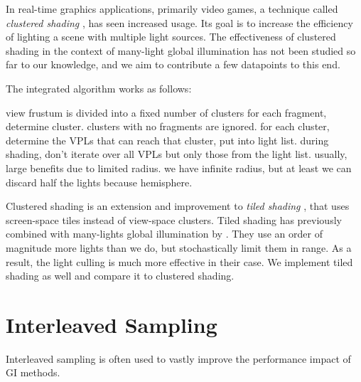 In real-time graphics applications, primarily video games, a technique called \textit{clustered shading} \citep{olsson2012clustered}, has seen increased usage. Its goal is to increase the efficiency of lighting a scene with multiple light sources.
The effectiveness of clustered shading in the context of many-light global illumination has not been studied so far to our knowledge, and we aim to contribute a few datapoints to this end.

The integrated algorithm works as follows:
\begin{outline}
\1 view frustum is divided into a fixed number of clusters
\1 for each fragment, determine cluster. clusters with no fragments are ignored.
\1 for each cluster, determine the VPLs that can reach that cluster, put into light list.
\1 during shading, don't iterate over all VPLs but only those from the light list.
\1 usually, large benefits due to limited radius. we have infinite radius, but at least we can discard half the lights because hemisphere.
\end{outline}

Clustered shading is an extension and improvement to \textit{tiled shading} \citep{Olsson:2011:TiledShading}, that uses screen-space tiles instead of view-space clusters. Tiled shading has previously combined with many-lights global illumination by \citet{Tokuyoshi:2016:Stochastic}. They use an order of magnitude more lights than we do, but stochastically limit them in range. As a result, the light culling is much more effective in their case.
We implement tiled shading as well and compare it to clustered shading.


\section{Interleaved Sampling}
\label{sec:concept:interleavedSampling}
Interleaved sampling \citep{Keller:2001:InterleavedSampling} is often used to vastly improve the performance impact of GI methods.

